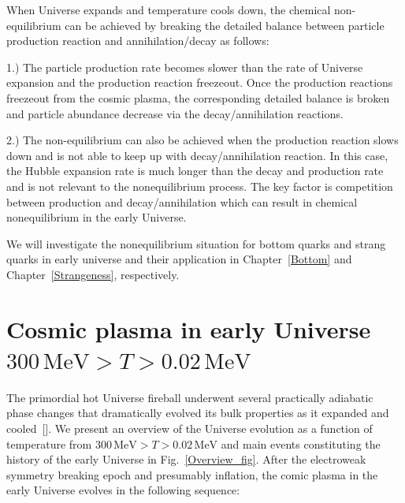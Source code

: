 When Universe expands and temperature cools down, the chemical non-equilibrium can be achieved by breaking the detailed balance between particle production reaction and annihilation/decay as follows:

1.) The particle production rate becomes slower than the rate of Universe expansion and the production reaction freezeout. Once the production reactions freezeout from the cosmic plasma, the corresponding detailed balance is broken and particle abundance decrease via the decay/annihilation reactions.
 

2.) The non-equilibrium can also be achieved when the production reaction slows down and is not able to keep up with decay/annihilation reaction. In this case, the Hubble expansion rate is much longer than the decay and production rate and is not relevant to the nonequilibrium process. The key factor is competition between production and decay/annihilation  which can result in chemical nonequilibrium in the early Universe.

\noindent We will investigate the nonequilibrium situation for bottom quarks and strang quarks in early universe and their application in Chapter~\ref{Bottom} and Chapter~\ref{Strangeness}, respectively.  





\section{Cosmic plasma in early Universe $300\,\mathrm{MeV}>T>0.02\,\mathrm{MeV}$}

The primordial hot Universe fireball underwent several practically adiabatic phase changes that dramatically evolved its bulk properties as it expanded and cooled~[\cite{Rafelski:2023emw}]. We present an overview of the Universe evolution as a function of temperature from $300\,\mathrm{MeV}>T>0.02\,\mathrm{MeV}$ and main events constituting the history of the early Universe in Fig.~\ref{Overview_fig}. After the electroweak symmetry breaking epoch and presumably inflation, the comic plasma in the early Universe evolves in the following sequence:

